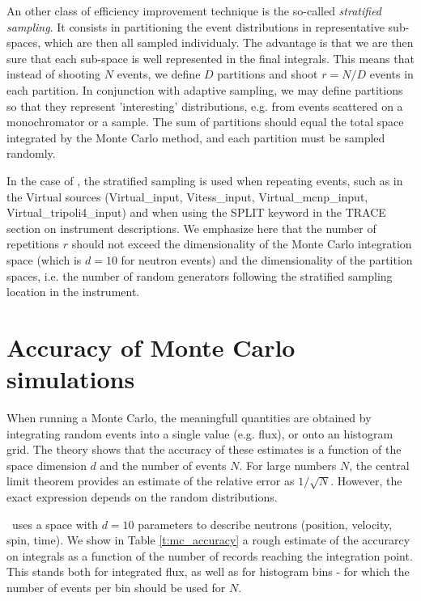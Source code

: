 An other class of efficiency improvement technique is the so-called \emph{stratified sampling}. It consists in partitioning the event distributions in representative sub-spaces, which are then all sampled individualy. The advantage is that we are then sure that each sub-space is well represented in the final integrals. This means that instead of shooting $N$ events, we define $D$ partitions and shoot $r=N/D$ events in each partition. In conjunction with adaptive sampling, we may define partitions so that they represent 'interesting' distributions, e.g. from events scattered on a monochromator or a sample. The sum of partitions should equal the total space integrated by the Monte Carlo method, and each partition must be sampled randomly.

In the case of \MCS, the stratified sampling is used when repeating events, such as in the Virtual sources (Virtual\_input, Vitess\_input, Virtual\_mcnp\_input, Virtual\_tripoli4\_input) and when using the SPLIT keyword in the TRACE section on instrument descriptions. We emphasize here that the number of repetitions $r$ should not exceed the dimensionality of the Monte Carlo integration space (which is $d=10$ for neutron events) and the dimensionality of the partition spaces, i.e. the number of random generators following the stratified sampling location in the instrument.

\section{Accuracy of Monte Carlo simulations}

When running a Monte Carlo, the meaningfull quantities are obtained by integrating random events into a single value (e.g. flux), or onto an histogram grid. The theory \cite{James80} shows that the accuracy of these estimates is a function of the space dimension $d$ and the number of events $N$. For large numbers $N$, the central limit theorem provides an estimate of the relative error as $1/\sqrt{N}$. However, the exact expression depends on the random distributions.

\MCS\ uses a space with $d=10$ parameters to describe neutrons (position, velocity, spin, time). We show in Table \ref{t:mc_accuracy} a rough estimate of the accurarcy on integrals as a function of the number of records reaching the integration point. This stands both for integrated flux, as well as for histogram bins - for which the number of events per bin should be used for $N$.

